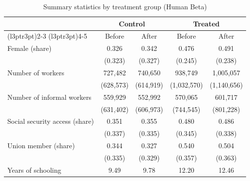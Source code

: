 \begin{table}[H]
  \centering
  \caption{\label{tab:sumstats_exposure_beta_human}Summary statistics by treatment group (Human Beta)}
  \centering
  \begin{threeparttable}
    \begin{tabular}[t]{lcccc}
      \toprule
      \multicolumn{1}{c}{ }          & \multicolumn{2}{c}{Control} & \multicolumn{2}{c}{Treated}                             \\
      \cmidrule(l{3pt}r{3pt}){2-3} \cmidrule(l{3pt}r{3pt}){4-5}
                                     & Before                      & After                       & Before      & After       \\
      \midrule
      Female (share)                 & 0.326                       & 0.342                       & 0.476       & 0.491       \\
                                     & (0.323)                     & (0.327)                     & (0.245)     & (0.238)     \\
      \addlinespace[3pt]
      Number of workers              & 727,482                     & 740,650                     & 938,749     & 1,005,057   \\
                                     & (628,573)                   & (614,919)                   & (1,032,570) & (1,140,656) \\
      \addlinespace[3pt]
      Number of informal workers     & 559,929                     & 552,992                     & 570,065     & 601,717     \\
                                     & (631,402)                   & (606,973)                   & (744,545)   & (801,228)   \\
      \addlinespace[3pt]
      Social security access (share) & 0.351                       & 0.355                       & 0.480       & 0.486       \\
                                     & (0.337)                     & (0.335)                     & (0.345)     & (0.338)     \\
      \addlinespace[3pt]
      Union member (share)           & 0.344                       & 0.327                       & 0.540       & 0.504       \\
                                     & (0.335)                     & (0.329)                     & (0.357)     & (0.363)     \\
      \addlinespace[3pt]
      Years of schooling             & 9.49                        & 9.78                        & 12.20       & 12.46       \\

\end{tabular}
\end{threeparttable}
\end{table}
